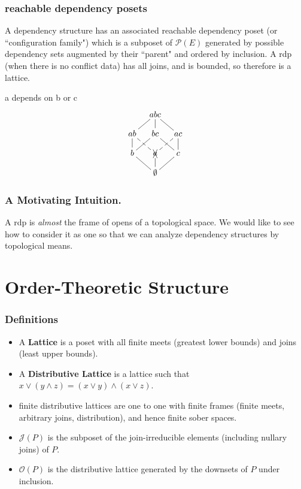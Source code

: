 \documentclass{beamer}
\newcommand{\Oc}{\mathcal{O}}
\newcommand{\Pc}{\mathcal{P}}
\newcommand{\Jc}{\mathcal{J}}
\begin{document}
\begin{frame}
\frametitle{reachable dependency posets}
A dependency structure has an associated reachable dependency poset (or ``configuration family") which is a subposet of \(\Pc(E)\) generated by possible dependency sets augmented by their ``parent" and ordered by inclusion. A rdp (when there is no conflict data) has all joins, and is bounded, so therefore is a lattice.
\begin{block}{a depends on b or c}
\begin{equation*}
    \xymatrix@=1em{& abc \ar@{-}[dl] \ar@{-}[d] \ar@{-}[dr] & \\
      ab \ar@{-}[d] \ar@{--}[dr] & bc \ar@{-}[dl] \ar@{-}[dr] &
        ac \ar@{-}[d] \ar@{--}[dl] \\
      b \ar@{-}[dr] & \xcancel{a} \ar@{--}[d] & c \ar@{-}[dl] \\
       & \emptyset &}
\end{equation*}
\end{block}
\end{frame}

\begin{frame}
\frametitle{A Motivating Intuition.}
A rdp is \textit{almost} the frame of opens of a topological space. We would like to see how to consider it as one so that we can analyze dependency structures by topological means.
\end{frame}

\section{Order-Theoretic Structure}

\begin{frame}
\frametitle{Definitions}
\begin{itemize}
\item A \textbf{Lattice} is a poset with all finite meets (greatest lower bounds) and joins (least upper bounds).

\item A \textbf{Distributive Lattice} is a lattice such that \(x \vee (y \wedge z) = (x \vee y) \wedge (x \vee z)\).

\item finite distributive lattices are one to one with finite frames (finite meets, arbitrary joins, distribution), and hence finite sober spaces.

\item \textbf{\(\Jc(P)\)} is the subposet of the join-irreducible elements (including nullary joins) of \(P\).

\item \textbf{\(\Oc(P)\)} is the distributive lattice generated by the downsets of \(P\) under inclusion.
\end{itemize}
\end{frame}
\end{document}

